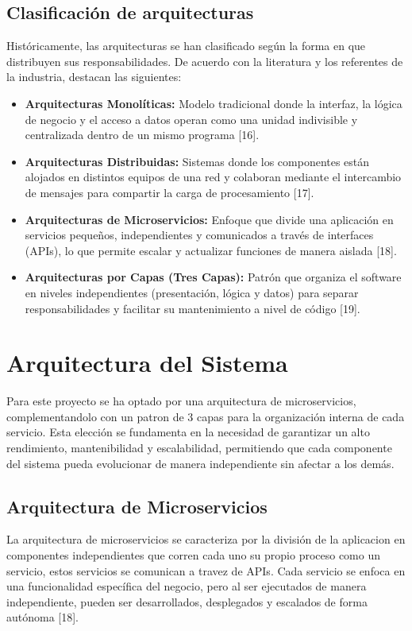\subsection{Clasificación de arquitecturas}

Históricamente, las arquitecturas se han clasificado según la forma en que distribuyen sus responsabilidades. De acuerdo con la literatura y los referentes de la industria, destacan las siguientes:

\begin{itemize}
    \item \textbf{Arquitecturas Monolíticas:} Modelo tradicional donde la interfaz, la lógica de negocio y el acceso a datos operan como una unidad indivisible y centralizada dentro de un mismo programa [16].
    \item \textbf{Arquitecturas Distribuidas:} Sistemas donde los componentes están alojados en distintos equipos de una red y colaboran mediante el intercambio de mensajes para compartir la carga de procesamiento [17].
    \item \textbf{Arquitecturas de Microservicios:} Enfoque que divide una aplicación en servicios pequeños, independientes y comunicados a través de interfaces (APIs), lo que permite escalar y actualizar funciones de manera aislada [18].
    \item \textbf{Arquitecturas por Capas (Tres Capas):} Patrón que organiza el software en niveles independientes (presentación, lógica y datos) para separar responsabilidades y facilitar su mantenimiento a nivel de código [19].
\end{itemize}

\section{Arquitectura del Sistema}
Para este proyecto se ha optado por una arquitectura de microservicios, complementandolo con un patron de 3 capas para la organización interna de cada servicio. Esta elección se fundamenta en la necesidad de garantizar un alto rendimiento, mantenibilidad y escalabilidad, permitiendo que cada componente del sistema pueda evolucionar de manera independiente sin afectar a los demás.

\subsection{Arquitectura de Microservicios}
La arquitectura de microservicios se caracteriza por la división de la aplicacion en componentes independientes que corren cada uno su propio proceso como un servicio, estos servicios se comunican a travez de APIs. Cada servicio se enfoca en una funcionalidad específica del negocio, pero al ser ejecutados de manera independiente, pueden ser desarrollados, desplegados y escalados de forma autónoma [18].

